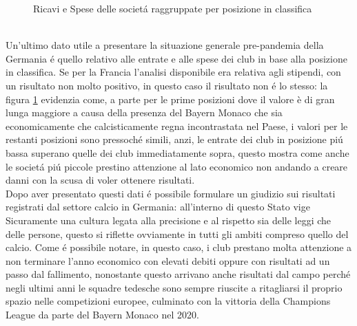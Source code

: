 \documentclass[
    corpo=11.5pt,
    oneside,
    evenboxes,
    tipotesi=triennale,
    stile=classica,
    oldstyle,
    autoretitolo,
    greek,
]{toptesi}
\begin{document}
\begin{interlinea}{1.5}
\begin{figure}
    \caption{Ricavi e Spese delle societ\'a raggruppate per posizione in classifica}
    \label{bunde_spese_ricavi_club}
\end{figure}\\
Un'ultimo dato utile a presentare la situazione generale pre-pandemia della Germania \'e quello relativo alle entrate e alle spese dei 
club in base alla posizione in classifica. Se per la Francia l'analisi disponibile era relativa agli stipendi, con un risultato non molto
positivo, in questo caso il risultato non \'e lo stesso: la figura \ref{bunde_spese_ricavi_club} evidenzia come, a parte per le prime posizioni
dove il valore è di gran lunga maggiore a causa della presenza del Bayern Monaco che sia economicamente che calcisticamente regna 
incontrastata nel Paese, i valori per le restanti posizioni sono pressoch\'e simili, anzi, le entrate dei club in posizione pi\'u
bassa superano quelle dei club immediatamente sopra, questo mostra come anche le societ\'a pi\'u piccole prestino attenzione al lato economico
non andando a creare danni con la scusa di voler ottenere risultati.\\
Dopo aver presentato questi dati \'e possibile formulare un giudizio sui risultati registrati dal settore calcio in Germania: all'interno
di questo Stato vige Sicuramente una cultura legata alla precisione e al rispetto sia delle leggi che delle persone, questo si riflette 
ovviamente in tutti gli ambiti compreso quello del calcio. Come \'e possibile notare, in questo caso, i club prestano molta attenzione a non 
terminare l'anno economico con elevati debiti oppure con risultati ad un passo dal fallimento, nonostante questo arrivano anche risultati dal 
campo perch\'e negli ultimi anni le squadre tedesche sono sempre riuscite a ritagliarsi il proprio spazio nelle competizioni europee, 
culminato con la vittoria della Champions League da parte del Bayern Monaco nel 2020. 

\end{interlinea}
\end{document}
